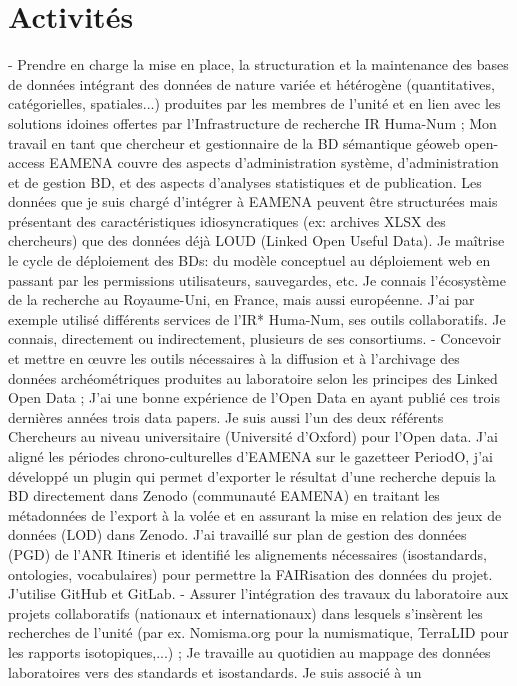 \section*{Activités}
- Prendre en charge la mise en place, la structuration et la maintenance des bases de données intégrant des données de
nature variée et hétérogène (quantitatives, catégorielles, spatiales...) produites par les membres de l'unité et en lien
avec les solutions idoines offertes par l'Infrastructure de recherche IR Huma-Num ;
Mon travail en tant que chercheur et gestionnaire de la BD sémantique géoweb open-access EAMENA couvre des aspects
d'administration système, d'administration et de gestion BD, et des aspects d'analyses statistiques et de publication. Les
données que je suis chargé d'intégrer à EAMENA peuvent être structurées mais présentant des caractéristiques
idiosyncratiques (ex: archives XLSX des chercheurs) que des données déjà LOUD (Linked Open Useful Data). Je
maîtrise le cycle de déploiement des BDs: du modèle conceptuel au déploiement web en passant par les permissions
utilisateurs, sauvegardes, etc. Je connais l'écosystème de la recherche au Royaume-Uni, en France, mais aussi
européenne. J'ai par exemple utilisé différents services de l'IR* Huma-Num, ses outils collaboratifs. Je connais,
directement ou indirectement, plusieurs de ses consortiums.
- Concevoir et mettre en œuvre les outils nécessaires à la diffusion et à l'archivage des données archéométriques
produites au laboratoire selon les principes des Linked Open Data ;
J'ai une bonne expérience de l'Open Data en ayant publié ces trois dernières années trois data papers. Je suis aussi l'un
des deux référents Chercheurs au niveau universitaire (Université d'Oxford) pour l'Open data. J'ai aligné les périodes
chrono-culturelles d'EAMENA sur le gazetteer PeriodO, j'ai développé un plugin qui permet d'exporter le résultat d'une
recherche depuis la BD directement dans Zenodo (communauté EAMENA) en traitant les métadonnées de l'export à la
volée et en assurant la mise en relation des jeux de données (LOD) dans Zenodo. J'ai travaillé sur plan de gestion des
données (PGD) de l'ANR Itineris et identifié les alignements nécessaires (isostandards, ontologies, vocabulaires) pour
permettre la FAIRisation des données du projet. J'utilise GitHub et GitLab.
- Assurer l'intégration des travaux du laboratoire aux projets collaboratifs (nationaux et internationaux) dans lesquels
s'insèrent les recherches de l'unité (par ex. Nomisma.org pour la numismatique, TerraLID pour les rapports isotopiques,...) ;
Je travaille au quotidien au mappage des données laboratoires vers des standards et isostandards. Je suis associé à un
